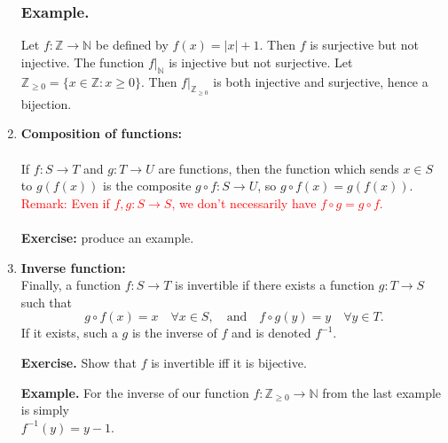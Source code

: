 \begin{enumerate}
                \subsubsection*{Example.}
                    Let \( f: \mathbb{Z} \rightarrow \mathbb{N} \) be defined by \( f(x) = |x| + 1 \). Then \( f \) is surjective but not injective. The function \( f|_{\mathbb{N}} \) is injective but not surjective. Let \( \mathbb{Z}_{\geq 0} = \{ x \in \mathbb{Z} : x \geq 0 \} \). Then \( f|_{\mathbb{Z}_{\geq 0}} \) is both injective and surjective, hence a bijection. 
                \vspace*{0.5cm}
        \item \textbf{Composition of functions:}\\ \\
            If \( f: S \rightarrow T \) and \( g: T \rightarrow U \) are functions, then the function which sends \( x \in S \) to \( g(f(x)) \) is the composite \( g \circ f: S \rightarrow U \), so \( g \circ f(x) = g(f(x)) \). \textcolor{red}{Remark: Even if \( f, g: S \rightarrow S \), we don’t necessarily have \( f \circ g = g \circ f \).} \\ \\
            \textbf{Exercise:} produce an example.\\
            \vspace*{0.5cm}
        \item \textbf{Inverse function:}\\ 
            Finally, a function \( f: S \rightarrow T \) is invertible if there exists a function \( g: T \rightarrow S \) such that
            \[
            g \circ f(x) = x \quad \forall x \in S, \quad \text{and} \quad f \circ g(y) = y \quad \forall y \in T.
            \]
            If it exists, such a \( g \) is the inverse of \( f \) and is denoted \( f^{-1} \).

            \textbf{Exercise.} Show that \( f \) is invertible iff it is bijective.

            \textbf{Example.} For the inverse of our function \( f: \mathbb{Z}_{\geq 0} \rightarrow \mathbb{N} \) from the last example is simply\\ \( f^{-1}(y) = y - 1 \).       
        \end{enumerate}
    
    

